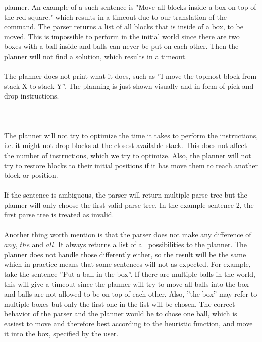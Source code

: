 planner. An example of a such sentence is "Move all blocks inside a box on top
of the red square." which results in a timeout due to our translation of the
command. The parser returns a list of all blocks that is inside of a box, to be
moved. This is impossible to perform in the initial world since there are two
boxes with a ball inside and balls can never be put on each other. Then the
planner will not find a solution, which results in a timeout.\\\\
The planner does not print what it does, such as ''I move the topmost block
from stack X to stack Y''. The planning is just shown visually and in form of
pick and drop instructions. \\\\\\\\
The planner will not try to optimize the time it takes to perform the
instructions, i.e. it might not drop blocks at the closest available stack.
This does not affect the number of instructions, which we try to optimize.
Also, the planner will not try to restore blocks to their initial positions if
it has move them to reach another block or position. 
\\\\
If the sentence is ambiguous, the parser will return multiple parse tree but
the planner will only choose the first valid parse tree. In the example
sentence 2, the first parse tree is treated as invalid. 
\\\\
Another thing worth mention is that the parser does not make any difference of
$any$, $the$ and $all$. It always returns a list of all possibilities to the
planner. The planner does not handle those differently either, so the result will be 
the same which in practice means that some sentences will not as expected. For example, 
take the sentence ''Put a ball in the box''. If there are multiple balls in the world, 
this will give a timeout since the planner will try to move all balls into the box and 
balls are not allowed to be on top of each other. Also, ''the box'' may refer to 
multiple boxes but only the first one in the list will be chosen. The correct behavior of 
the parser and the planner would be to chose one ball, which is easiest to move and therefore 
best according to the heuristic function, and move it into the box, specified 
by the user. 
